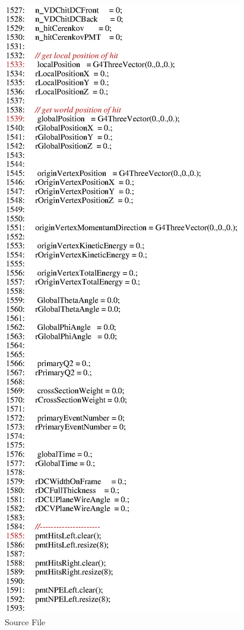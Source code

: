 \begin{figure}[h]
  \hspace{0cm}
  \includegraphics[scale=0.8]{./figures13/QweakSimEventAction.cc-p27.eps}
  \caption{Source File}
           \label{fig:XIII-SC-42}
\end{figure}

